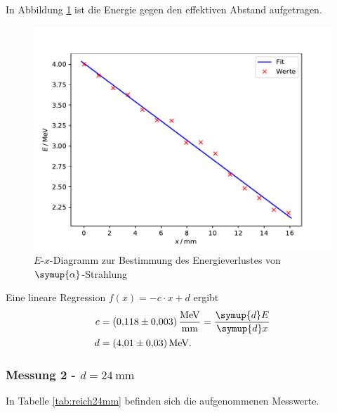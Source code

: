 In Abbildung \ref{fig:energie23mm} ist die Energie gegen den effektiven Abstand aufgetragen.
\begin{figure}[H]
  \centering
  \includegraphics[width=\textwidth]{Plots/energie23mm.pdf}
  \caption{$E$-$x$-Diagramm zur Bestimmung des Energieverlustes von $\symup{\alpha}$-Strahlung}
  \label{fig:energie23mm}
\end{figure}

Eine lineare Regression $f(x) = -c \cdot x + d$ ergibt
\begin{align*}
  c &= \SI{0,118(3)}{\MeV \per \mm} = \frac{\symup{d} E}{\symup{d} x} \\
  d &= \SI{4,01(3)}{\MeV}.
\end{align*}

\subsubsection{Messung 2 - $d = \SI{24}{\mm}$ \label{sec:24mm}}

In Tabelle \ref{tab:reich24mm} befinden sich die aufgenommenen Messwerte.



